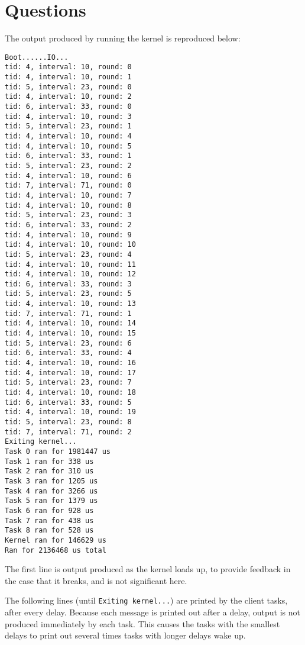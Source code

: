 \documentclass[titlepage]{article}
\begin{document}
\section{Questions}

The output produced by running the kernel is reproduced below:

\begin{verbatim}
Boot......IO...
tid: 4, interval: 10, round: 0
tid: 4, interval: 10, round: 1
tid: 5, interval: 23, round: 0
tid: 4, interval: 10, round: 2
tid: 6, interval: 33, round: 0
tid: 4, interval: 10, round: 3
tid: 5, interval: 23, round: 1
tid: 4, interval: 10, round: 4
tid: 4, interval: 10, round: 5
tid: 6, interval: 33, round: 1
tid: 5, interval: 23, round: 2
tid: 4, interval: 10, round: 6
tid: 7, interval: 71, round: 0
tid: 4, interval: 10, round: 7
tid: 4, interval: 10, round: 8
tid: 5, interval: 23, round: 3
tid: 6, interval: 33, round: 2
tid: 4, interval: 10, round: 9
tid: 4, interval: 10, round: 10
tid: 5, interval: 23, round: 4
tid: 4, interval: 10, round: 11
tid: 4, interval: 10, round: 12
tid: 6, interval: 33, round: 3
tid: 5, interval: 23, round: 5
tid: 4, interval: 10, round: 13
tid: 7, interval: 71, round: 1
tid: 4, interval: 10, round: 14
tid: 4, interval: 10, round: 15
tid: 5, interval: 23, round: 6
tid: 6, interval: 33, round: 4
tid: 4, interval: 10, round: 16
tid: 4, interval: 10, round: 17
tid: 5, interval: 23, round: 7
tid: 4, interval: 10, round: 18
tid: 6, interval: 33, round: 5
tid: 4, interval: 10, round: 19
tid: 5, interval: 23, round: 8
tid: 7, interval: 71, round: 2
Exiting kernel...
Task 0 ran for 1981447 us
Task 1 ran for 338 us
Task 2 ran for 310 us
Task 3 ran for 1205 us
Task 4 ran for 3266 us
Task 5 ran for 1379 us
Task 6 ran for 928 us
Task 7 ran for 438 us
Task 8 ran for 528 us
Kernel ran for 146629 us
Ran for 2136468 us total
\end{verbatim}

The first line is output produced as the kernel loads up, to provide feedback in the case that it breaks,
and is not significant here.

The following lines (until \texttt{Exiting kernel...}) are printed by the client tasks, after every delay.
Because each message is printed out after a delay, output is not produced immediately by each task.
This causes the tasks with the smallest delays to print out several times tasks with longer delays wake up.
\end{document}

